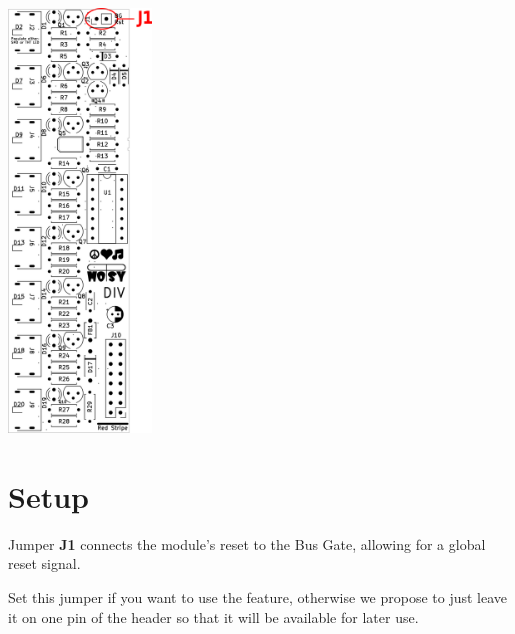 \documentclass[a4paper,
               11pt,
               parskip=half,
               headinclude,
               titlepage=false]{scrartcl}
\begin{document}
\begin{minipage}[]{4cm}
\includegraphics[width=3.8cm, trim={0 7cm 0 0}, clip]{div-Bus-Gate-Reset}
\end{minipage}
\hspace{0.5cm}
\begin{minipage}[]{10.5cm}
\setlength{\parskip}{\medskipamount}


\section*{Setup}

Jumper \textbf{\color{red}J1} connects the module's reset to the Bus Gate, allowing for a global reset signal.

Set this jumper if you want to use the feature, otherwise we propose to just leave it on one pin of the header so that it will be available for later use.

\end{minipage}
\end{document}
